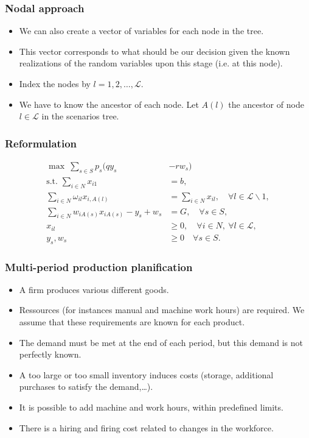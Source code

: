 \documentclass{beamer}
\begin{document}
\begin{frame}
\frametitle{Nodal approach}

\begin{itemize}
\item
We can also create a vector of variables for each node in the tree.
\item
This vector corresponds to what should be our decision given the known realizations of the random variables upon this stage (i.e. at this node).
\item
Index the nodes by $l = 1,2,\ldots,\mathcal{L}$.
\item
We have to know the ancestor of each node.
Let $A(l)$ the ancestor of node $l \in \mathcal{L}$ in the scenarios tree.
\end{itemize}

\end{frame}

\begin{frame}
\frametitle{Reformulation}

\begin{align*}
\max\ \sum_{s \in S} p_s (qy_{s} & - rw_{s})\\
\mbox{s.t. } \sum_{i \in N} x_{i1} & = b,\\
\sum_{i \in N} \omega_{il}x_{i,A(l)} & = \sum_{i \in N} x_{il}, \quad \forall l \in \mathcal{L} \backslash 1, \\
\sum_{i \in N} w_{iA(s)}x_{iA(s)} - y_{s} + w_{s} & = G,
\quad {\forall s \in S}, \\
x_{il} & \geq 0, \quad \forall i \in N,\ \forall l \in \mathcal{L},\\
y_{s}, w_{s} & \geq 0 \quad {\forall s \in S}.
\end{align*}

\end{frame}

\begin{frame}
\frametitle{Multi-period production planification}

\begin{itemize}
\item
A firm produces various different goods.
\item
Ressources (for instances manual and machine work hours) are required.
We assume that these requirements are known for each product.
\item
The demand must be met at the end of each period, but this demand is not perfectly known.
\item
A too large or too small inventory induces costs (storage, additional purchases to satisfy the demand,\ldots).
\item
It is possible to add machine and work hours, within predefined limits.
\item
There is a hiring and firing cost related to changes in the workforce.
\end{itemize}

\end{frame}
\end{document}
